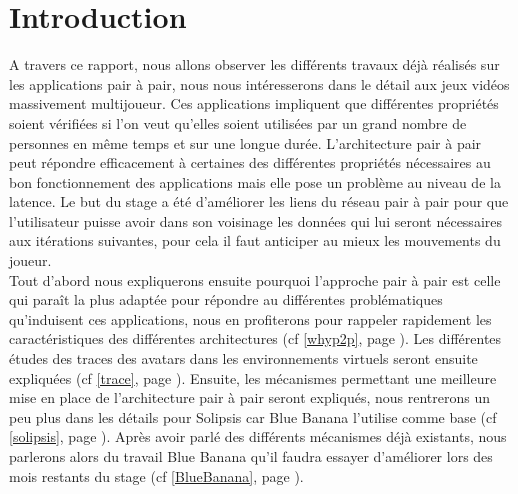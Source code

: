 \section{Introduction}
	A travers ce rapport, nous allons observer les différents travaux déjà réalisés sur les applications pair à pair, nous nous intéresserons dans le détail aux jeux vidéos massivement multijoueur. Ces applications impliquent que différentes propriétés soient vérifiées si l'on veut qu'elles soient utilisées par un grand nombre de personnes en même temps et sur une longue durée. L'architecture pair à pair peut répondre efficacement à certaines des différentes propriétés nécessaires au bon fonctionnement des applications mais elle pose un problème au niveau de la latence. Le but du stage a été d'améliorer les liens du réseau pair à pair pour que l'utilisateur puisse avoir dans son voisinage les données qui lui seront nécessaires aux itérations suivantes, pour cela il faut anticiper au mieux les mouvements du joueur.\\

	Tout d'abord nous expliquerons ensuite pourquoi l'approche pair à pair est celle qui paraît la plus adaptée pour répondre au différentes problématiques qu'induisent ces applications, nous en profiterons pour rappeler rapidement les caractéristiques des différentes architectures (cf \ref{whyp2p}, page \pageref{whyp2p}). Les différentes études des traces des avatars dans les environnements virtuels seront ensuite expliquées (cf \ref{trace}, page \pageref{trace}). Ensuite, les mécanismes permettant une meilleure mise en place de l'architecture pair à pair seront expliqués, nous rentrerons un peu plus dans les détails pour Solipsis car Blue Banana l'utilise comme base (cf \ref{solipsis}, page \pageref{solipsis}). Après avoir parlé des différents mécanismes déjà existants, nous parlerons alors du travail Blue Banana qu'il faudra essayer d'améliorer lors des mois restants du stage (cf \ref{BlueBanana}, page \pageref{BlueBanana}).
